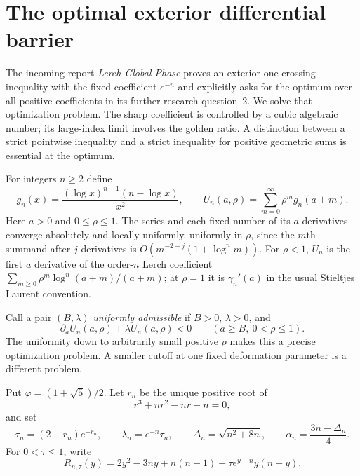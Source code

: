 \section{The optimal exterior differential barrier}
\label{opt:sec:barrier}

The incoming report \emph{Lerch Global Phase} proves an exterior
one-crossing inequality with the fixed coefficient $e^{-n}$ and explicitly
asks for the optimum over all positive coefficients in its further-research
question~2. We solve that optimization problem. The sharp coefficient is
controlled by a cubic algebraic number; its large-index limit involves the
golden ratio. A distinction between a strict pointwise inequality and a
strict inequality for positive geometric sums is essential at the optimum.

For integers $n\geq2$ define
\begin{equation}\label{opt:eq:family}
 g_n(x)=\frac{(\log x)^{n-1}(n-\log x)}{x^2},\qquad
 U_n(a,\rho)=\sum_{m=0}^{\infty}\rho^m g_n(a+m).
\end{equation}
Here $a>0$ and $0\leq\rho\leq1$. The series and each fixed number
of its $a$ derivatives converge absolutely and locally uniformly,
uniformly in $\rho$, since the $m$th summand after $j$ derivatives is
$O(m^{-2-j}(1+\log^n m))$. For $\rho<1$, $U_n$ is the first
$a$ derivative of the order-$n$ Lerch coefficient
$\sum_{m\geq0}\rho^m\log^n(a+m)/(a+m)$; at $\rho=1$ it is
$\gamma_n'(a)$ in the usual Stieltjes Laurent convention.

Call a pair $(B,\lambda)$ \emph{uniformly admissible} if $B>0$,
$\lambda>0$, and
\begin{equation}\label{opt:eq:admissible}
 \partial_aU_n(a,\rho)+\lambda U_n(a,\rho)<0
 \qquad(a\geq B,\ 0<\rho\leq1).
\end{equation}
The uniformity down to arbitrarily small positive $\rho$ makes this a
precise optimization problem. A smaller cutoff at one fixed deformation
parameter is a different problem.

Put $\varphi=(1+\sqrt5)/2$. Let $r_n$ be the unique positive root of
\begin{equation}\label{opt:eq:cubic}
 r^3+nr^2-nr-n=0,
\end{equation}
and set
\begin{equation}\label{opt:eq:lambda}
 \tau_n=(2-r_n)e^{-r_n},\qquad \lambda_n=e^{-n}\tau_n,
 \qquad \Delta_n=\sqrt{n^2+8n},\qquad
 \alpha_n=\frac{3n-\Delta_n}{4}.
\end{equation}
For $0<\tau\leq1$, write
\begin{equation}\label{opt:eq:R}
 R_{n,\tau}(y)=2y^2-3ny+n(n-1)+\tau e^{y-n}y(n-y).
\end{equation}


